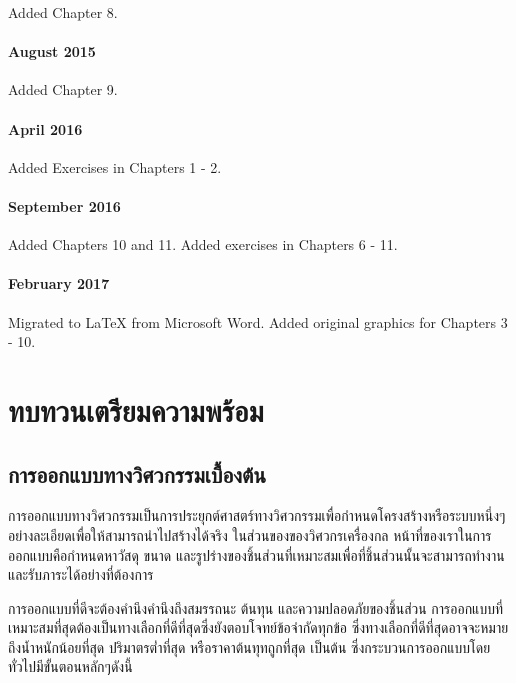 \documentclass[a4paper,openany,nobib]{tufte-book}
\begin{document}
Added Chapter 8.

\subsubsection*{August 2015}
\label{sec:org65a3f79}

Added Chapter 9.

\subsubsection*{April 2016}
\label{sec:org44fbe98}

Added Exercises in Chapters 1 - 2.

\subsubsection*{September 2016}
\label{sec:orgc04a047}

Added Chapters 10 and 11. Added exercises in Chapters 6 - 11.

\subsubsection*{February 2017}
\label{sec:org9edf93f}

Migrated to \LaTeX{} from Microsoft Word. Added original graphics for
Chapters 3 - 10.

\tableofcontents

\listoffigures

\listoftables

\mainmatter
\chapter{ทบทวนเตรียมความพร้อม}
\label{sec:org2cfdf7e}

\section{การออกแบบทางวิศวกรรมเบื้องต้น}
\label{sec:orgaf3fa27}
การออกแบบทางวิศวกรรมเป็นการประยุกต์ศาสตร์ทางวิศวกรรมเพื่อกำหนดโครงสร้างหรือระบบหนึ่งๆอย่างละเอียดเพื่อให้สามารถนำไปสร้างได้จริง ในส่วนของของวิศวกรเครื่องกล หน้าที่ของเราในการออกแบบคือกำหนดหาวัสดุ ขนาด และรูปร่างของชิ้นส่วนที่เหมาะสมเพื่อที่ชิ้นส่วนนั้นจะสามารถทำงานและรับภาระได้อย่างที่ต้องการ

การออกแบบที่ดีจะต้องคำนึงคำนึงถึงสมรรถนะ ต้นทุน และความปลอดภัยของชิ้นส่วน การออกแบบที่เหมาะสมที่สุดต้องเป็นทางเลือกที่ดีที่สุดซึ่งยังตอบโจทย์ข้อจำกัดทุกข้อ ซึ่งทางเลือกที่ดีที่สุดอาจจะหมายถึงน้ำหนักน้อยที่สุด ปริมาตรต่ำที่สุด หรือราคาต้นทุทถูกที่สุด เป็นต้น ซึ่งกระบวนการออกแบบโดยทั่วไปมีขั้นตอนหลักๆดังนี้
\end{document}
